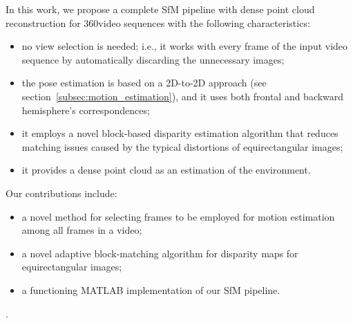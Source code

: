 In this work, we propose a complete SfM pipeline with dense point cloud 
reconstruction for 360\degree video sequences with the following 
characteristics:
\begin{itemize}
	\item no view selection is needed; i.e., it works with every frame of the 
	input video sequence by automatically discarding the unnecessary images;
	\item the pose estimation is based on a 2D-to-2D approach
	(see section~\ref{subsec:motion_estimation}), and it uses both frontal and
	backward hemisphere's correspondences;
	\item it employs a novel block-based disparity estimation algorithm that 
	reduces matching issues caused by the typical distortions of equirectangular images;
	\item it provides a dense point cloud as an estimation of the environment.
\end{itemize}
%
Our contributions include:
%
\begin{itemize}
	\item a novel method for selecting frames to be employed for motion estimation 
    among all frames in a video;
	\item a novel adaptive block-matching algorithm for disparity maps for 
	equirectangular images;
	\item a functioning MATLAB implementation of our SfM pipeline.
\end{itemize}.
